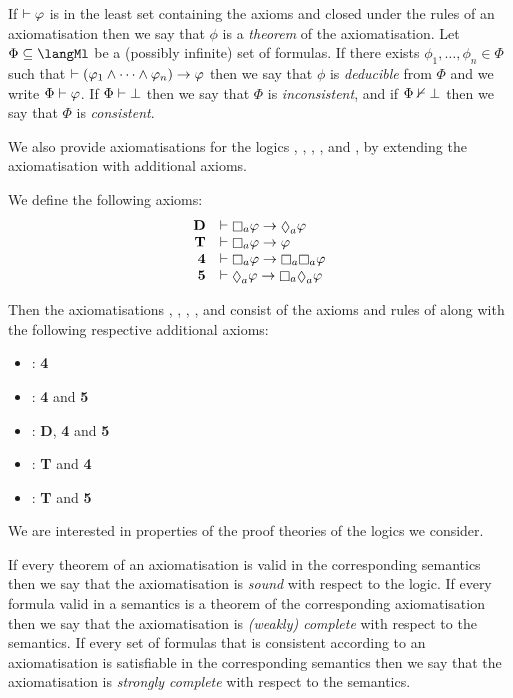If $\vdash \varphi$ is in the least set containing the axioms and closed under the rules of an axiomatisation then we say that $\phi$ is a {\em theorem} of the axiomatisation.
Let $\Phi \subseteq \langMl$ be a (possibly infinite) set of formulas.
If there exists $\phi_1, \dots, \phi_n \in \Phi$ such that $\vdash (\varphi_1 \land \cdots \land \varphi_n) \rightarrow \varphi$ then we say that $\phi$ is {\em deducible} from $\Phi$ and we write $\Phi \vdash \varphi$.
If $\Phi \vdash \bot$ then we say that $\Phi$ is {\em inconsistent}, and if $\Phi \nvdash \bot$ then we say that $\Phi$ is {\em consistent}.

We also provide axiomatisations for the logics \logicKF{}, \logicKFF{}, \logicKD{}, \logicSF{}, and \logicS{}, by extending the axiomatisation \axiomK{} with additional axioms.

\begin{definition}
We define the following axioms:
$$
\begin{array}{rl}
    {\bf D}     & \proves \necessaryA \phi \implies \possibleA \phi\\
    {\bf T}     & \proves \necessaryA \phi \implies \phi\\
    {\bf 4}     & \proves \necessaryA \phi \implies \necessaryA \necessaryA \phi\\
    {\bf 5}     & \proves \possibleA \phi \implies \necessaryA \possibleA \phi
\end{array}
$$

Then the axiomatisations \axiomKF{}, \axiomKFF{}, \axiomKD{}, \axiomSF{}, and \axiomS{} consist of the axioms and rules of \axiomK{} along with the following respective additional axioms:
\begin{itemize}
    \item \axiomKF{}: {\bf 4}
    \item \axiomKFF{}: {\bf 4} and {\bf 5}
    \item \axiomKD{}: {\bf D}, {\bf 4} and {\bf 5}
    \item \axiomSF{}: {\bf T} and {\bf 4}
    \item \axiomS{}: {\bf T} and {\bf 5}
\end{itemize}
\end{definition}


We are interested in properties of the proof theories of the logics we consider.

\begin{definition}
If every theorem of an axiomatisation is valid in the corresponding semantics then we say that the axiomatisation is {\em sound} with respect to the logic.
If every formula valid in a semantics is a theorem of the corresponding axiomatisation then we say that the axiomatisation is {\em (weakly) complete} with respect to the semantics.
If every set of formulas that is consistent according to an axiomatisation is satisfiable in the corresponding semantics then we say that the axiomatisation is {\em strongly complete} with respect to the semantics.
\end{definition}


